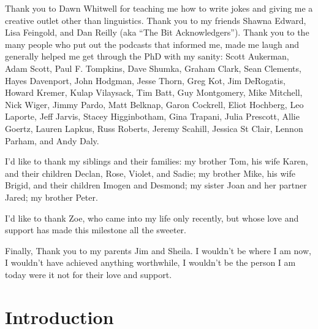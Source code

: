 \documentclass[
	12pt,
	twoside,
	narrowmargins
	]{ut-thesis}
\theoremstyle{definition}
\begin{document}
\begin{preliminary}
\begin{acknowledgements}
	  Thank you to Dawn Whitwell for teaching me how to write jokes and giving me a creative outlet other than linguistics. Thank you to my friends Shawna Edward, Lisa Feingold, and Dan Reilly (aka ``The Bit Acknowledgers'').
	  Thank you to the many people who put out the podcasts that informed me, made me laugh and generally helped me get through the PhD with my sanity:
	  Scott Aukerman, Adam Scott, Paul F. Tompkins, Dave Shumka, Graham Clark, Sean Clements, Hayes Davenport, John Hodgman, Jesse Thorn, Greg Kot, Jim DeRogatis, Howard Kremer, Kulap Vilaysack, Tim Batt, Guy Montgomery, Mike Mitchell, Nick Wiger, Jimmy Pardo, Matt Belknap, Garon Cockrell, Eliot Hochberg, Leo Laporte, Jeff Jarvis, Stacey Higginbotham, Gina Trapani, Julia Prescott, Allie Goertz, Lauren Lapkus, Russ Roberts, Jeremy Scahill, Jessica St Clair, Lennon Parham, and Andy Daly.


	  I'd like to thank my siblings and their families:
	  my brother Tom, his wife Karen, and their children Declan, Rose, Violet, and Sadie;
	  my brother Mike, his wife Brigid, and their children Imogen and Desmond;
	  my sister Joan and her partner Jared;
	  my brother Peter.


	  I'd like to thank Zoe, who came into my life only recently, but whose love and support has made this milestone all the sweeter.

	  Finally, Thank you to my parents Jim and Sheila.
	  I wouldn't be where I am now, I wouldn't have achieved anything worthwhile, I wouldn't be the person I am today were it not for their love and support. 
  \end{acknowledgements}
  \tableofcontents
  \listoftables
  \listoffigures
  \listoftheorems[ignoreall,show={defn}]
\end{preliminary}
\chapter{Introduction}

\end{document}
